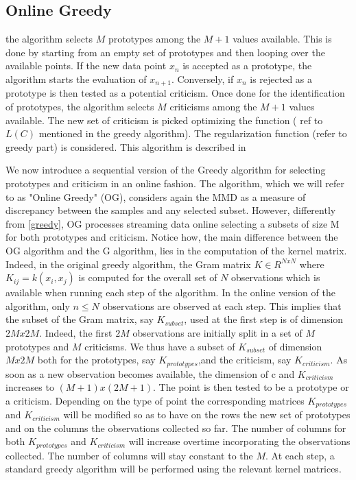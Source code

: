 \documentclass{article}
\begin{document}
	\subsection{Online Greedy}
	the algorithm selects $M$ prototypes among the $M+1$ values available. This is done by starting from an empty set of prototypes and then looping over the available points. If the new data point $x_n$ is accepted as a prototype, the algorithm starts the evaluation of $x_{n+1}$. Conversely, if $x_n$ is rejected as a prototype is then tested as a potential criticism. Once done for the identification of prototypes, the algorithm selects $M$ criticisms among the $M+1$ values available. The new set of criticism is picked optimizing the function ( ref to $L(C)$ mentioned in the greedy algorithm). The regularization function (refer to greedy part) is considered. This algorithm is described in 
	
	
	We now introduce a sequential version of the Greedy algorithm for selecting prototypes and criticism in an online fashion. The algorithm, which we will refer to as "Online Greedy" (OG), considers again the MMD as a measure of discrepancy between the samples and any selected subset. However, differently from \ref{greedy}, OG processes streaming data online selecting a subsets of size M for both prototypes and criticism.  Notice how, the main difference between the OG algorithm and the G algorithm, lies in the computation of the kernel matrix. Indeed, in the original greedy algorithm, the Gram matrix $K \in R^{NxN}$ where $K_{ij}=k(x_i,x_j)$ is computed for the overall set of $N$ observations which is available when running each step of the algorithm. In the online version of the algorithm, only $n \leq N$ observations are observed at each step. This implies that the subset of the Gram matrix, say $K_{subset}$, used at the first step is of dimension $2Mx2M$. Indeed, the first $2M$ observations are initially split in a set of $M$ prototypes and $M$ criticisms. We thus have a subset of $K_{subset}$ of dimension $Mx2M$ both for the prototypes, say $K_{prototypes}$,and the criticism, say $K_{criticism}$. As soon as a new observation becomes available, the dimension of c and $K_{criticism}$ increases to $(M+1)x(2M+1)$. The point is then tested to be a prototype or a criticism. Depending on the type of point the corresponding matrices $K_{prototypes}$ and $K_{criticism}$ will be modified so as to have on the rows the new set of prototypes and on the columns the observations collected so far. The number of columns for both $K_{prototypes}$ and $K_{criticism}$ will increase overtime incorporating the observations collected. The number of columns will stay constant to the $M$. At each step, a standard greedy algorithm will be performed using the relevant kernel matrices.  
	
\end{document}
